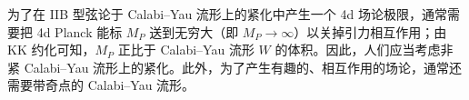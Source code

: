 

为了在 IIB 型弦论于 Calabi--Yau 流形上的紧化中产生一个 4d 场论极限，通常需要把 4d Planck 能标 $M_P$ 送到无穷大（即 $M_P\to\infty$）以关掉引力相互作用；由 KK 约化可知，$M_P$ 正比于 Calabi--Yau 流形 $W$ 的体积。因此，人们应当考虑非紧 Calabi--Yau 流形上的紧化。此外，为了产生有趣的、相互作用的场论，通常还需要带奇点的 Calabi--Yau 流形。

